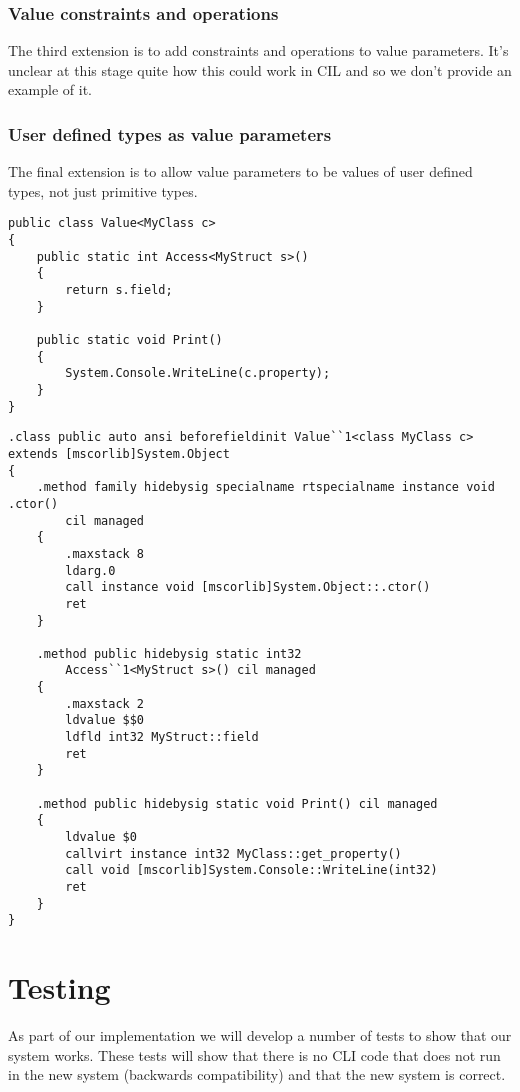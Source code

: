 \subsection{Value constraints and operations}

The third extension is to add constraints and operations to value
parameters. It's unclear at this stage quite how this could work in
CIL and so we don't provide an example of it.


\subsection{User defined types as value parameters}

The final extension is to allow value parameters to be values of user
defined types, not just primitive types.

\begin{lstlisting}[caption={User defined types as value parameters in extended C\#},keywordstyle={\color{blue}},language=sharpc]
public class Value<MyClass c>
{
	public static int Access<MyStruct s>()
	{
		return s.field;
	}

	public static void Print()
	{
		System.Console.WriteLine(c.property);
	}
}
\end{lstlisting}


\begin{lstlisting}[caption={Corresponding CIL},language=cil]
.class public auto ansi beforefieldinit Value``1<class MyClass c>
extends [mscorlib]System.Object 
{
	.method family hidebysig specialname rtspecialname instance void .ctor() 
		cil managed
	{
		.maxstack 8
		ldarg.0
		call instance void [mscorlib]System.Object::.ctor()
		ret
	}

	.method public hidebysig static int32 
		Access``1<MyStruct s>() cil managed
	{
		.maxstack 2
		ldvalue $$0
		ldfld int32 MyStruct::field
		ret
	}

	.method public hidebysig static void Print() cil managed
	{
		ldvalue $0
		callvirt instance int32 MyClass::get_property()    
		call void [mscorlib]System.Console::WriteLine(int32)
		ret
	}
}
\end{lstlisting}

\chapter{Testing}

As part of our implementation we will develop a number of tests to show that
our system works. These tests will show that there is no CLI code that does
not run in the new system (backwards compatibility) and that the new system is
correct.

